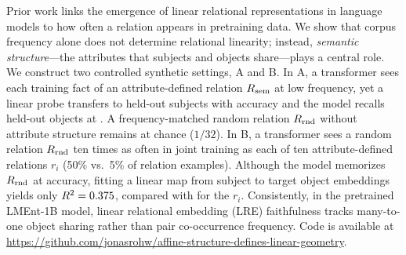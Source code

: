


Prior work links the emergence of linear relational representations in language
models to how often a relation appears in pretraining data. We show that corpus
frequency alone does not determine relational linearity; instead, \emph{semantic
structure}---the attributes that subjects and objects share---plays a central
role. We construct two controlled synthetic settings, A and B. In A, a
transformer sees each training fact of an attribute-defined relation $R_{\mathrm{sem}}$ at
low frequency, yet a linear probe transfers to held-out subjects with
\ExpOneSemanticProbe{} accuracy and the model recalls held-out objects at
\ExpOneSemanticHeldout{}. A frequency-matched random relation $R_{\mathrm{rnd}}$ without
attribute structure remains at chance ($1/32$). In B, a transformer sees a
random relation $R_{\mathrm{rnd}}$ ten times as often in joint training as each of ten
attribute-defined relations $r_i$ (50\% vs.\ 5\% of relation examples).
Although the model memorizes $R_{\mathrm{rnd}}$ at \ExpTwoRandom{} accuracy, fitting a
linear map from subject to target object embeddings yields only
$R^2=0.375{}$, compared with \ExpTwoStructuredRsq{} for the $r_i$.
Consistently, in the pretrained LMEnt-1B model, linear relational
embedding (LRE) faithfulness tracks many-to-one object sharing rather than pair
co-occurrence frequency.
Code is available at \url{https://github.com/jonasrohw/affine-structure-defines-linear-geometry}.
